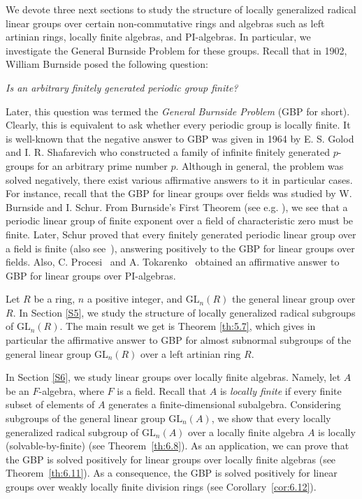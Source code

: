 \documentclass{amsart}
\theoremstyle{definition}
\begin{document}
We devote three next sections to study the structure of locally generalized radical linear groups over certain non-commutative rings and algebras such as left artinian rings, locally finite algebras, and PI-algebras. In particular, we investigate the General Burnside Problem for these groups.  Recall that in 1902, William Burnside \cite{Pa_Burn_1902} posed the following question: \begin{center}
	\textit{Is an arbitrary finitely generated periodic group finite?}
\end{center} 
Later, this question was termed the \textit{General Burnside Problem} (GBP for short).	Clearly, this is equivalent to ask whether every periodic group is locally finite.  It is well-known that the negative answer to GBP was given in 1964 by E. S. Golod and I. R. Shafarevich  who constructed  \cite{Pa_Golod_1964, Pa_Golod-Shaf_1964} a family of infinite finitely generated $p$-groups for an arbitrary prime number $p$. Although in general, the problem was solved negatively, there exist various affirmative answers to it in particular cases. For instance, recall that the GBP for linear groups over fields was studied by W. Burnside and I. Schur. From Burnside's First Theorem (see e.g. \cite[(9.4)]{Bo_Lam_2001}), we see that a periodic linear group of finite exponent over a field of characteristic zero must be finite. Later, Schur \cite{Pa_Schur_1911} proved  that every finitely generated periodic linear group over a field is finite (also see~\cite[(9.9)]{Bo_Lam_2001}), answering positively to the GBP for linear groups over fields. Also, C. Procesi~\cite{Pa_Procesi_1966} and A. Tokarenko~\cite{Pa_Tokarenko_1968} obtained an affirmative answer to GBP for linear groups over $\mathrm{PI}$-algebras.

Let $R$ be a ring, $n$ a positive integer, and $\mathrm{GL}_n(R)$ the general linear group over $R$. In Section \ref{S5}, we study the structure of locally generalized radical subgroups of $\mathrm{GL}_n(R)$. The main result we get is Theorem \ref{th:5.7}, which gives in particular the affirmative answer to GBP for almost subnormal subgroups of the general linear group $\mathrm{GL}_n(R)$ over a left artinian ring $R.$

In Section \ref{S6}, we study linear groups over locally finite algebras. Namely, let $A$ be an $F$-algebra, where $F$ is a field. Recall that $A$ is \textit{locally finite} if every finite subset of elements of $A$ generates a finite-dimensional subalgebra. Considering subgroups of the general linear group $\mathrm{GL}_n(A)$, we show that every locally generalized radical subgroup of $\mathrm{GL}_n(A)$ over a locally finite algebra $A$ is locally (solvable-by-finite) (see Theorem~\ref{th:6.8}). As an application, we can prove that the GBP is solved positively for linear groups over locally finite algebras (see Theorem~\ref{th:6.11}). As a consequence, the GBP is solved positively for linear groups over weakly locally finite division rings (see Corollary~\ref{cor:6.12}).
\end{document}
